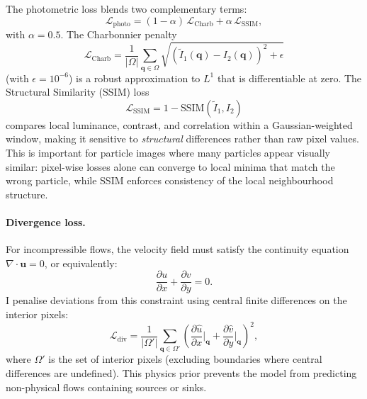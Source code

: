 \documentclass[11pt, a4paper]{article}
\newcommand{\pd}[2]{\frac{\partial #1}{\partial #2}}
\newcommand{\vect}[1]{\bm{#1}}
\begin{document}
The photometric loss blends two complementary terms:
\begin{equation}
    \mathcal{L}_\text{photo} = (1 - \alpha)\, \mathcal{L}_\text{Charb} + \alpha\, \mathcal{L}_\text{SSIM},
    \label{eq:photo_blend}
\end{equation}
with $\alpha = 0.5$.
The Charbonnier penalty~\cite{charbonnier1994two}
\begin{equation}
    \mathcal{L}_\text{Charb} = \frac{1}{|\Omega|} \sum_{\vect{q} \in \Omega} \sqrt{\left(\tilde{I}_1(\vect{q}) - I_2(\vect{q})\right)^2 + \epsilon}
    \label{eq:charbonnier}
\end{equation}
(with $\epsilon = 10^{-6}$) is a robust approximation to $L^1$ that is differentiable at zero.
The Structural Similarity (SSIM) loss~\cite{wang2004image}
\begin{equation}
    \mathcal{L}_\text{SSIM} = 1 - \text{SSIM}(\tilde{I}_1, I_2)
    \label{eq:ssim}
\end{equation}
compares local luminance, contrast, and correlation within a Gaussian-weighted window, making it sensitive to \emph{structural} differences rather than raw pixel values.
This is important for particle images where many particles appear visually similar: pixel-wise losses alone can converge to local minima that match the wrong particle, while SSIM enforces consistency of the local neighbourhood structure.

\paragraph{Divergence loss.}
For incompressible flows, the velocity field must satisfy the continuity equation $\nabla \cdot \vect{u} = 0$, or equivalently:
\begin{equation}
    \pd{u}{x} + \pd{v}{y} = 0.
    \label{eq:divergence}
\end{equation}
I penalise deviations from this constraint using central finite differences on the interior pixels:
\begin{equation}
    \mathcal{L}_\text{div} = \frac{1}{|\Omega'|} \sum_{\vect{q} \in \Omega'} \left( \pd{\hat{u}}{x}\bigg|_{\vect{q}} + \pd{\hat{v}}{y}\bigg|_{\vect{q}} \right)^2,
    \label{eq:div_loss}
\end{equation}
where $\Omega'$ is the set of interior pixels (excluding boundaries where central differences are undefined).
This physics prior prevents the model from predicting non-physical flows containing sources or sinks.
\end{document}
